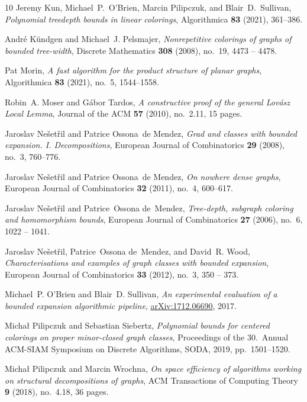 \documentclass[11pt]{article}
\begin{document}
\begin{thebibliography}{10}
Jeremy Kun, Michael~P.\ O'Brien, Marcin Pilipczuk, and Blair~D.\ Sullivan,
  \emph{Polynomial treedepth bounds in linear colorings}, Algorithmica
  \textbf{83} (2021), 361--386.

André Kündgen and Michael~J. Pelsmajer, \emph{Nonrepetitive colorings of
  graphs of bounded tree-width}, Discrete Mathematics \textbf{308} (2008),
  no.~19, 4473 -- 4478.

Pat Morin, \emph{A fast algorithm for the product structure of planar graphs},
  Algorithmica \textbf{83} (2021), no.~5, 1544--1558.

Robin~A. Moser and G\'{a}bor Tardos, \emph{A constructive proof of the general
  {L}ov\'{a}sz {L}ocal {L}emma}, Journal of the ACM \textbf{57} (2010),
  no.~2.11, 15 pages.

Jaroslav Ne{\v{s}}et{\v{r}}il and Patrice Ossona~de Mendez, \emph{Grad and
  classes with bounded expansion. {I}. {D}ecompositions}, European Journal of
  Combinatorics \textbf{29} (2008), no.~3, 760--776.

{J}aroslav Ne{\v{s}}et{\v{r}}il and Patrice Ossona~de Mendez, \emph{On nowhere
  dense graphs}, European Journal of Combinatorics \textbf{32} (2011), no.~4,
  600--617.

Jaroslav Nešetřil and Patrice~Ossona de~Mendez, \emph{Tree-depth, subgraph
  coloring and homomorphism bounds}, European Journal of Combinatorics
  \textbf{27} (2006), no.~6, 1022 -- 1041.

Jaroslav Nešetřil, Patrice~Ossona de~Mendez, and David~R. Wood,
  \emph{Characterisations and examples of graph classes with bounded
  expansion}, European Journal of Combinatorics \textbf{33} (2012), no.~3, 350
  -- 373.

Michael~P. O’Brien and Blair~D. Sullivan, \emph{An experimental evaluation of
  a bounded expansion algorithmic pipeline},
  \href{https://arxiv.org/abs/1712.06690}{arXiv:1712.06690}, 2017.

Micha{\l} Pilipczuk and Sebastian Siebertz, \emph{Polynomial bounds for
  centered colorings on proper minor-closed graph classes}, Proceedings of the
  30.\ Annual ACM-SIAM Symposium on Discrete Algorithms, SODA, 2019,
  pp.~1501--1520.

Micha{\l} Pilipczuk and Marcin Wrochna, \emph{On space efficiency of algorithms
  working on structural decompositions of graphs}, ACM Transactions of
  Computing Theory \textbf{9} (2018), no.~4.18, 36 pages.


\end{thebibliography}
\end{document}

